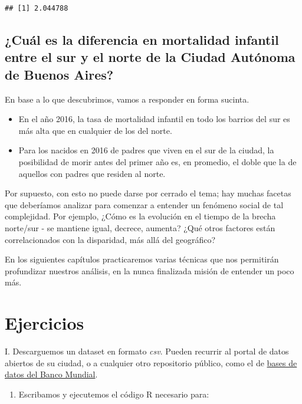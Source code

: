 \documentclass[spanish,]{book}
\providecommand{\tightlist}{%
  \setlength{\itemsep}{0pt}\setlength{\parskip}{0pt}}
\begin{document}
\begin{verbatim}
## [1] 2.044788
\end{verbatim}

\hypertarget{cuuxe1l-es-la-diferencia-en-mortalidad-infantil-entre-el-sur-y-el-norte-de-la-ciudad-autuxf3noma-de-buenos-aires}{%
\subsection{¿Cuál es la diferencia en mortalidad infantil entre el sur y el norte de la Ciudad Autónoma de Buenos Aires?}\label{cuuxe1l-es-la-diferencia-en-mortalidad-infantil-entre-el-sur-y-el-norte-de-la-ciudad-autuxf3noma-de-buenos-aires}}

En base a lo que descubrimos, vamos a responder en forma sucinta.

\begin{itemize}
\item
  En el año 2016, la tasa de mortalidad infantil en todo los barrios del sur es más alta que en cualquier de los del norte.
\item
  Para los nacidos en 2016 de padres que viven en el sur de la ciudad, la posibilidad de morir antes del primer año es, en promedio, el doble que la de aquellos con padres que residen al norte.
\end{itemize}

Por supuesto, con esto no puede darse por cerrado el tema; hay muchas facetas que deberíamos analizar para comenzar a entender un fenómeno social de tal complejidad. Por ejemplo, ¿Cómo es la evolución en el tiempo de la brecha norte/sur - se mantiene igual, decrece, aumenta? ¿Qué otros factores están correlacionados con la disparidad, más allá del geográfico?

En los siguientes capítulos practicaremos varias técnicas que nos permitirán profundizar nuestros análisis, en la nunca finalizada misión de entender un poco más.

\hypertarget{ejercicios}{%
\section{Ejercicios}\label{ejercicios}}

I. Descarguemos un dataset en formato \emph{csv}. Pueden recurrir al portal de datos abiertos de su ciudad, o a cualquier otro repositorio público, como el de \href{https://databank.bancomundial.org/databases}{bases de datos del Banco Mundial}.

\begin{enumerate}
\def\labelenumi{\Roman{enumi}.}
\setcounter{enumi}{1}
\tightlist
\item
  Escribamos y ejecutemos el código R necesario para:
\end{enumerate}
\end{document}
